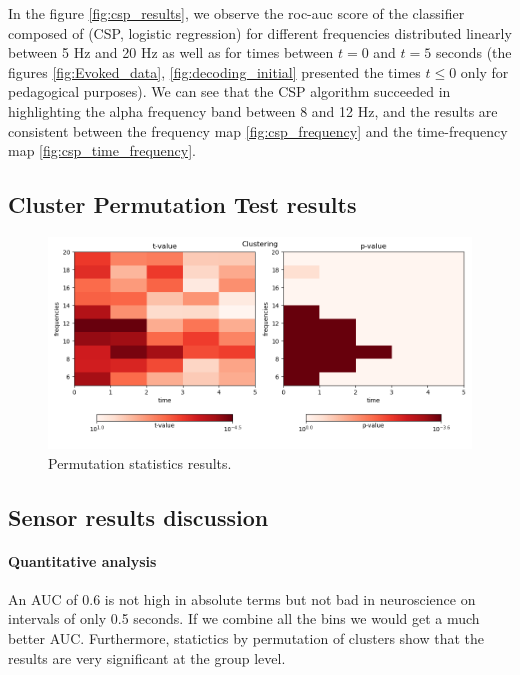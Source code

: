 
In the figure \ref{fig:csp_results}, we observe the roc-auc score of the classifier composed of (CSP, logistic regression) for different frequencies distributed linearly between 5 Hz and 20 Hz as well as for times between $t=0$ and $t=5$ seconds (the figures \ref{fig:Evoked_data}, \ref{fig:decoding_initial} presented the times $t \leq 0$ only for pedagogical purposes). We can see that the CSP algorithm succeeded in highlighting the alpha frequency band between 8 and 12 Hz, and the results are consistent between the frequency map \ref{fig:csp_frequency} and the time-frequency map \ref{fig:csp_time_frequency}.

\subsection{Cluster Permutation Test results}

\begin{figure}[ht]
    \centering
    \includegraphics[width=15cm]{images_report/sensor/csp_permutation_res/permutations_test.png}
    \caption[Permutation statistics results.]%
    {Permutation statistics results.}
    \label{permutation_statistics_results}
\end{figure}

\subsection{Sensor results discussion}

\paragraph{Quantitative analysis}
An AUC of 0.6 is not high in absolute terms but not bad in neuroscience on intervals of only 0.5 seconds. If we combine all the bins we would get a much better AUC. Furthermore, statictics by permutation of clusters show that the results are very significant at the group level.

